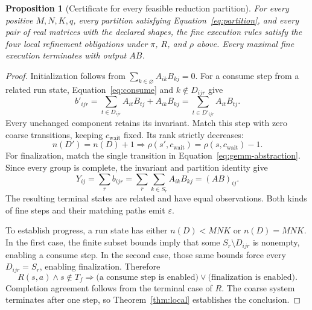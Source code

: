 \documentclass[11pt]{article}
\newtheorem{proposition}{Proposition}
\begin{document}
\begin{proposition}[Certificate for every feasible reduction partition]\label{prop:partition-certificate}
For every positive $M,N,K,q$, every partition satisfying Equation~\ref{eq:partition}, and every pair of real matrices with the declared shapes, the fine execution rules satisfy the four local refinement obligations under $\pi$, $R$, and $\rho$ above. Every maximal fine execution terminates with output $AB$.
\end{proposition}
\begin{proof}
Initialization follows from $\sum_{k\in\varnothing}A_{ik}B_{kj}=0$. For a consume step from a related run state, Equation~\ref{eq:consume} and $k\notin D_{ijr}$ give
\begin{equation}
 b'_{ijr}
 =\sum_{t\in D_{ijr}}A_{it}B_{tj}+A_{ik}B_{kj}
 =\sum_{t\in D'_{ijr}}A_{it}B_{tj}.
\end{equation}
Every unchanged component retains its invariant. Match this step with zero coarse transitions, keeping $c_{\mathrm{wait}}$ fixed. Its rank strictly decreases:
\begin{equation}
 n(D')=n(D)+1
 \Longrightarrow
 \rho(s',c_{\mathrm{wait}})=\rho(s,c_{\mathrm{wait}})-1.
\end{equation}
For finalization, match the single transition in Equation~\ref{eq:gemm-abstraction}. Since every group is complete, the invariant and partition identity give
\begin{equation}
 Y_{ij}=\sum_r b_{ijr}
 =\sum_r\sum_{k\in S_r}A_{ik}B_{kj}
 =(AB)_{ij}.
\end{equation}
The resulting terminal states are related and have equal observations. Both kinds of fine steps and their matching paths emit $\varepsilon$.

To establish progress, a run state has either $n(D)<MNK$ or $n(D)=MNK$. In the first case, the finite subset bounds imply that some $S_r\setminus D_{ijr}$ is nonempty, enabling a consume step. In the second case, those same bounds force every $D_{ijr}=S_r$, enabling finalization. Therefore
\begin{equation}
 R(s,a)\land s\notin T_f
 \Longrightarrow
 \bigl(\text{a consume step is enabled}\bigr)
 \lor\bigl(\text{finalization is enabled}\bigr).
\end{equation}
Completion agreement follows from the terminal case of $R$. The coarse system terminates after one step, so Theorem~\ref{thm:local} establishes the conclusion.
\end{proof}
\end{document}
